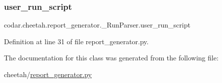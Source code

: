 \subsubsection{\texorpdfstring{user\+\_\+run\+\_\+script}{user\_run\_script}}
{\footnotesize\ttfamily codar.\+cheetah.\+report\+\_\+generator.\+\_\+\+Run\+Parser.\+user\+\_\+run\+\_\+script}



Definition at line 31 of file report\+\_\+generator.\+py.



The documentation for this class was generated from the following file\+:\begin{DoxyCompactItemize}
\item 
cheetah/\hyperlink{report__generator_8py}{report\+\_\+generator.\+py}\end{DoxyCompactItemize}

